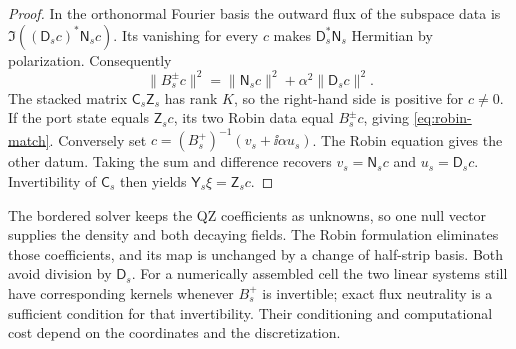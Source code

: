 \begin{proof}
In the orthonormal Fourier basis the outward flux of the subspace data
is $\Im((\mathsf D_sc)^*\mathsf N_sc)$. Its vanishing for every $c$
makes $\mathsf D_s^*\mathsf N_s$ Hermitian by polarization. Consequently
\[
 \|B_s^\pm c\|^2=\|\mathsf N_sc\|^2+\alpha^2\|\mathsf D_sc\|^2.
\]
The stacked matrix $\mathsf C_s\mathsf Z_s$ has rank $K$, so the
right-hand side is positive for $c\ne0$. If the port state equals
$\mathsf Z_sc$, its two Robin data equal $B_s^\pm c$, giving
\eqref{eq:robin-match}. Conversely set $c=(B_s^+)^{-1}(v_s+\ii\alpha u_s)$.
The Robin equation gives the other datum. Taking the sum and difference
recovers $v_s=\mathsf N_sc$ and $u_s=\mathsf D_sc$. Invertibility of
$\mathsf C_s$ then yields $\mathsf Y_s\xi=\mathsf Z_sc$.
\end{proof}

The bordered solver keeps the QZ coefficients as unknowns, so one null
vector supplies the density and both decaying fields. The Robin formulation
eliminates those coefficients, and its map is unchanged by a change of
half-strip basis. Both avoid division by $\mathsf D_s$. For a numerically
assembled cell the two linear systems still have corresponding kernels
whenever $B_s^+$ is invertible; exact flux neutrality is a sufficient
condition for that invertibility. Their conditioning and computational
cost depend on the coordinates and the discretization.
